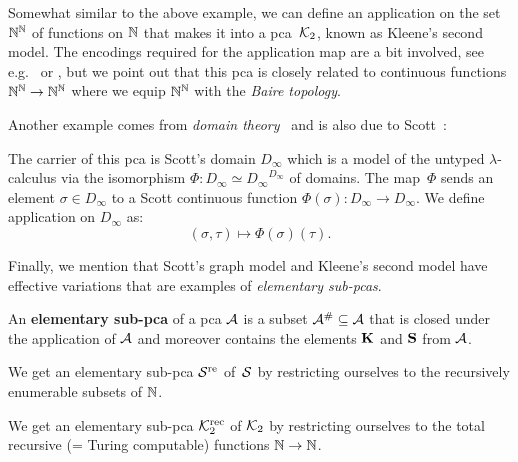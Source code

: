 \cite{KleeneVesley1965}
\begin{example}
  Somewhat similar to the above example, we can define an application on the set
  \(\Nat^\Nat\) of functions on \(\Nat\) that makes it into a pca~\(\Ktwo\),
  known as Kleene's second model.
  The encodings required for the application map are a bit involved, see
  e.g.~\cite[p.~30 and Section~2.1.2]{Bauer2023} or
  \cite[Section~1.4.3]{vanOosten2008}, but we point out that this pca is closely
  related to continuous functions \(\Nat^\Nat \to \Nat^\Nat\) where we equip
  \(\Nat^\Nat\) with the \emph{Baire topology}.
\end{example}

Another example comes from \emph{domain theory}~\cite{AmadioCurien1998} and is
also due to Scott~\cite{Scott1972}:
\begin{example}
  The carrier of this pca is Scott's domain \(D_\infty\) which is a model of the
  untyped \(\lambda\)-calculus via the isomorphism
  \(\Phi \colon D_\infty \simeq {D_\infty}^{D_\infty}\) of domains.
  The map~\(\Phi\) sends an element \(\sigma \in D_\infty\) to a Scott
  continuous function \(\Phi(\sigma) \colon D_\infty \to D_\infty\).
  We define application on \(D_\infty\) as:
  \[
    (\sigma,\tau) \mapsto \Phi(\sigma)(\tau).
  \]
\end{example}

Finally, we mention that Scott's graph model and Kleene's second model have
effective variations that are examples of \emph{elementary sub-pcas}.

\begin{definition}
  An \textbf{elementary sub-pca} of a pca \(\AA\) is a subset
  \(\AA^\# \subseteq \AA\) that is closed under the application of \(\AA\) and
  moreover contains the elements \(\kcomb\) and \(\scomb\) from \(\AA\).
\end{definition}

\begin{example}
  We get an elementary sub-pca \(\Scottre\) of~\(\Scott\) by restricting
  ourselves to the recursively enumerable subsets of \(\Nat\).
\end{example}

\begin{example}
  We get an elementary sub-pca \(\Ktworec\) of \(\Ktwo\) by restricting
  ourselves to the total recursive (= Turing computable) functions
  \(\Nat \to \Nat\).
\end{example}

